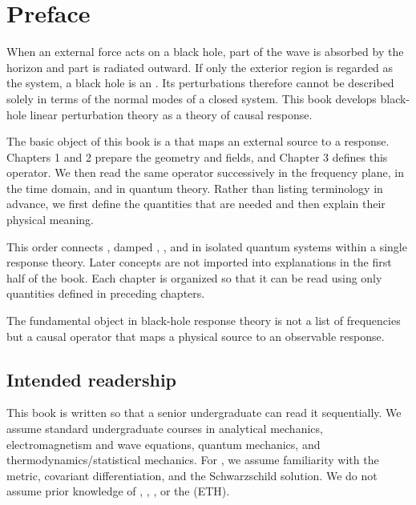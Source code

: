 \chapter*{Preface}

When an external force acts on a black hole, part of the wave is absorbed by the horizon and part is radiated outward. If only the exterior region is regarded as the system, a black hole is an . Its perturbations therefore cannot be described solely in terms of the normal modes of a closed system. This book develops black-hole linear perturbation theory as a theory of causal response.

The basic object of this book is a  that maps an external source to a response. Chapters 1 and 2 prepare the geometry and fields, and Chapter 3 defines this operator. We then read the same operator successively in the frequency plane, in the time domain, and in quantum theory. Rather than listing terminology in advance, we first define the quantities that are needed and then explain their physical meaning.

This order connects , damped , , and  in isolated quantum systems within a single response theory. Later concepts are not imported into explanations in the first half of the book. Each chapter is organized so that it can be read using only quantities defined in preceding chapters.

\begin{principlebox}
The fundamental object in black-hole response theory is not a list of frequencies but a causal operator that maps a physical source to an observable response.
\end{principlebox}

\section*{Intended readership}

This book is written so that a senior undergraduate can read it sequentially. We assume standard undergraduate courses in analytical mechanics, electromagnetism and wave equations, quantum mechanics, and thermodynamics/statistical mechanics. For , we assume familiarity with the metric, covariant differentiation, and the Schwarzschild solution. We do not assume prior knowledge of , , , or the  (ETH).

